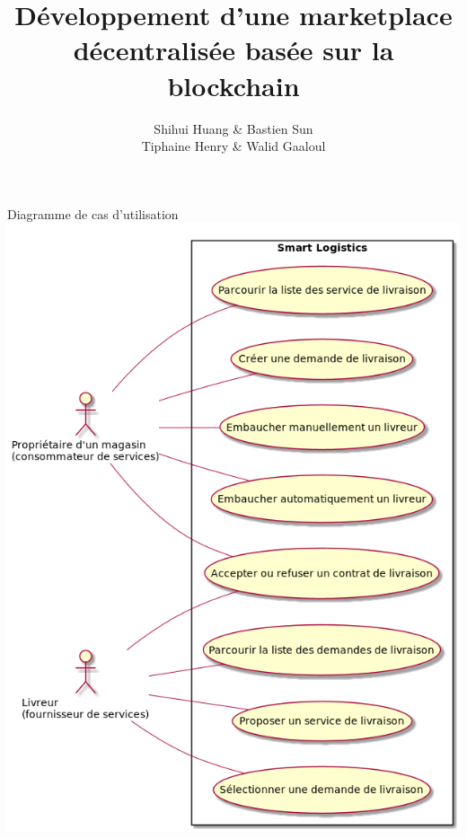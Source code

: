 \documentclass{beamer}
\title{Développement d'une marketplace décentralisée basée sur la blockchain}
\date{}
\author{Shihui Huang \& Bastien Sun\\Tiphaine Henry \& Walid Gaaloul}
\begin{document}
    \maketitle

    \begin{frame}{Diagramme de cas d'utilisation}
        \centering
        \includegraphics[height = .95\textheight]{use_case_diagram.png}
    \end{frame}
\end{document}
